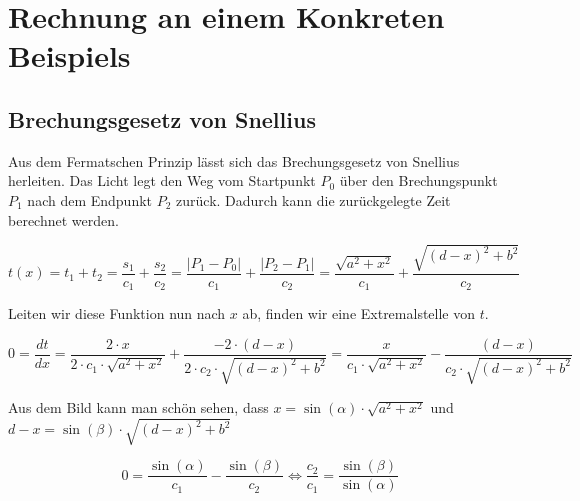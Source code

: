 \section{Rechnung an einem Konkreten Beispiels}

\subsection{Brechungsgesetz von Snellius}
\cite{Wikipedia}Aus dem Fermatschen Prinzip lässt sich das Brechungsgesetz von Snellius herleiten.
Das Licht legt den Weg vom Startpunkt $P_0$ über den Brechungspunkt $P_1$ 
nach dem Endpunkt $P_2$ zurück. Dadurch kann die zurückgelegte Zeit berechnet werden.



\[
t(x) =
t_1 + t_2 =
\frac{s_1}{c_1} + \frac{s_2}{c_2} =
\frac{|P_1 - P_0|}{c_1} + \frac{|P_2 - P_1|}{c_2} =
\frac{\sqrt{a^2 + x^2}}{c_1} + \frac{\sqrt{(d-x)^2 + b^2}}{c_2}
\]

Leiten wir diese Funktion nun nach $x$ ab, finden wir eine Extremalstelle von $t$.

\[
0 = 
\frac{dt}{dx} =
\frac{2 \cdot x}{2 \cdot c_1 \cdot \sqrt{a^2 + x^2}} + 
\frac{-2 \cdot (d-x)}{2 \cdot c_2 \cdot \sqrt{(d-x)^2 + b^2}} =
\frac{x}{c_1 \cdot \sqrt{a^2 + x^2}} - 
\frac{(d-x)}{c_2 \cdot \sqrt{(d-x)^2 + b^2}}
\]

Aus dem Bild kann man schön sehen, dass $x = \sin(\alpha) \cdot \sqrt{a^2 + x^2}$
und $d-x = \sin(\beta) \cdot \sqrt{(d -x)^2 + b^2}$

\[
0 = 
\frac{\sin(\alpha)}{c_1} - \frac{\sin(\beta)}{c_2} \Leftrightarrow
\frac{c_2}{c_1} = \frac{\sin(\beta)}{\sin(\alpha)}
\]




